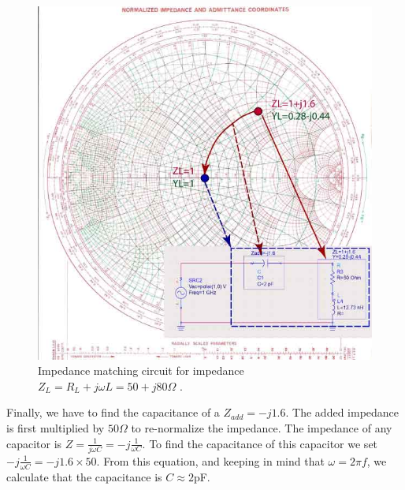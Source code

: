 \documentclass{ximera}
\begin{document}
\begin{figure}[htbp]
\begin{center}
\includegraphics[scale=0.4]{../jpg/test.jpg}
\end{center}
\caption{Impedance matching circuit for impedance $Z_L=R_L+j \omega L =50+j80 \Omega$ .}
\label{fig:SimpleMatch}
\end{figure}



Finally, we have to find the capacitance of a $Z_{add}=-j1.6$.  The added impedance is first multiplied by $50 \Omega$ to re-normalize the impedance. The impedance of any capacitor is $Z=\frac{1}{j \omega C}=-j \frac{1}{\omega C}$. To find the capacitance of this capacitor we set $-j \frac{1}{\omega C}=-j1.6 \times 50$. From this equation, and keeping in mind that $\omega = 2 \pi f$, we calculate that the capacitance is $C \approx 2$pF.
\end{document}
